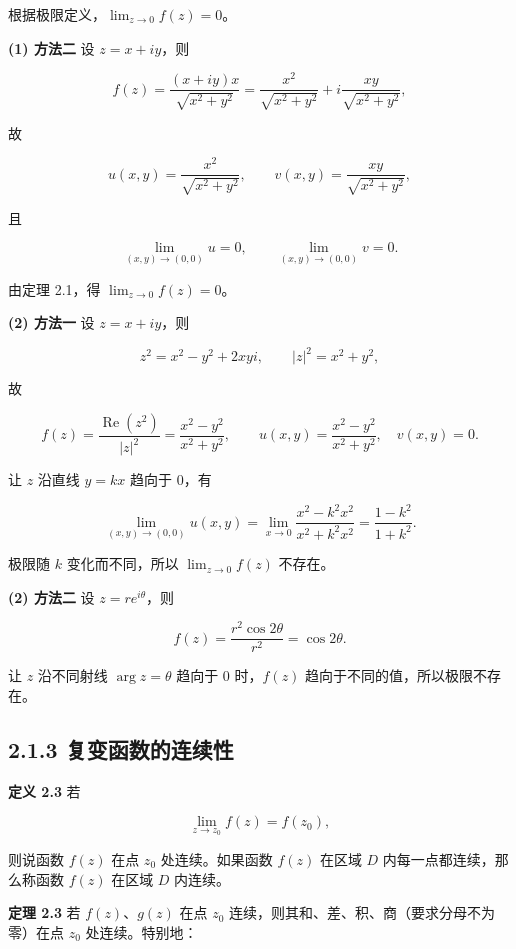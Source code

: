 根据极限定义，\(\lim_{z\to0}f(z)=0\)。

\textbf{(1) 方法二} 设 \(z=x+iy\)，则

\[
f(z)=\frac{(x+iy)x}{\sqrt{x^2+y^2}}
=\frac{x^2}{\sqrt{x^2+y^2}}+i\frac{xy}{\sqrt{x^2+y^2}},
\]

故

\[
u(x,y)=\frac{x^2}{\sqrt{x^2+y^2}},\qquad
v(x,y)=\frac{xy}{\sqrt{x^2+y^2}},
\]

且

\[
\lim_{(x,y)\to(0,0)}u=0,\qquad \lim_{(x,y)\to(0,0)}v=0 .
\]

由定理 2.1，得 \(\lim_{z\to0}f(z)=0\)。

\textbf{(2) 方法一} 设 \(z=x+iy\)，则

\[
z^2=x^2-y^2+2xyi,\qquad |z|^2=x^2+y^2,
\]

故

\[
f(z)=\frac{\operatorname{Re}(z^2)}{|z|^2}=\frac{x^2-y^2}{x^2+y^2},\qquad
u(x,y)=\frac{x^2-y^2}{x^2+y^2},\quad v(x,y)=0 .
\]

让 \(z\) 沿直线 \(y=kx\) 趋向于 \(0\)，有

\[
\lim_{(x,y)\to(0,0)}u(x,y)=\lim_{x\to0}\frac{x^2-k^2x^2}{x^2+k^2x^2}
=\frac{1-k^2}{1+k^2}.
\]

极限随 \(k\) 变化而不同，所以 \(\lim_{z\to0}f(z)\) 不存在。

\textbf{(2) 方法二} 设 \(z=re^{i\theta}\)，则

\[
f(z)=\frac{r^2\cos 2\theta}{r^2}=\cos 2\theta .
\]

让 \(z\) 沿不同射线 \(\arg z=\theta\) 趋向于 \(0\) 时，\(f(z)\)
趋向于不同的值，所以极限不存在。

\subsection{2.1.3
复变函数的连续性}\label{ux590dux53d8ux51fdux6570ux7684ux8fdeux7eedux6027}

\textbf{定义 2.3} 若

\[
\lim_{z\to z_0}f(z)=f(z_0),
\]

则说函数 \(f(z)\) 在点 \(z_0\) 处连续。如果函数 \(f(z)\) 在区域 \(D\)
内每一点都连续，那么称函数 \(f(z)\) 在区域 \(D\) 内连续。

\textbf{定理 2.3} 若 \(f(z)\)、\(g(z)\) 在点 \(z_0\)
连续，则其和、差、积、商（要求分母不为零）在点 \(z_0\) 处连续。特别地：

